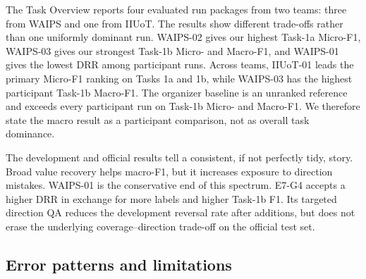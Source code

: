 \documentclass[sigconf,article,a4paper]{acmart}
\begin{document}
The Task Overview reports four evaluated run packages from two teams: three
from WAIPS and one from IIUoT. The results show different trade-offs rather than
one uniformly dominant run. WAIPS-02 gives our highest Task-1a Micro-F1,
WAIPS-03 gives our strongest Task-1b Micro- and Macro-F1, and WAIPS-01 gives the
lowest DRR among participant runs. Across teams, IIUoT-01 leads the primary
Micro-F1 ranking on Tasks 1a and 1b, while WAIPS-03 has the highest participant
Task-1b Macro-F1. The organizer baseline is an unranked reference and exceeds
every participant run on Task-1b Micro- and Macro-F1. We therefore state the
macro result as a participant comparison, not as overall task dominance.

\begin{table}[H]
  \caption{Official Task-1 results. Each F1 entry is Micro / Macro. The
  organizer baseline is unranked; bold marks the best participant.}
  \label{tab:official}
  \centering
  \scriptsize
\end{table}

The development and official results tell a consistent, if not perfectly tidy,
story. Broad value recovery helps macro-F1, but it increases exposure to
direction mistakes. WAIPS-01 is the conservative end of this spectrum. E7-G4
accepts a higher DRR in exchange for more labels and higher Task-1b F1. Its
targeted direction QA reduces the development reversal rate after additions,
but does not erase the underlying coverage--direction trade-off on the official
test set.

\subsection{Error patterns and limitations}
\end{document}
